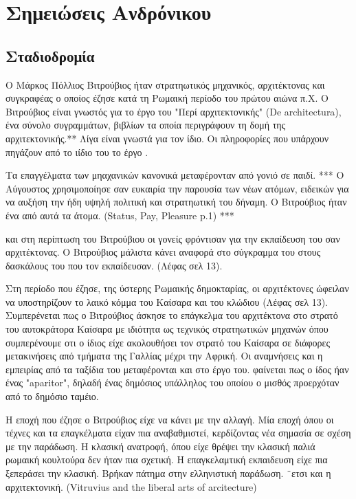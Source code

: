 
\section{Σημειώσεις Ανδρόνικου}

\subsection{Σταδιοδρομία}

Ο Μάρκος Πόλλιος Βιτρούβιος ήταν στρατηωτικός μηχανικός, αρχιτέκτονας και συγκραφέας ο οποίος έζησε κατά τη Ρωμαική περίοδο του πρώτου αιώνα π.Χ. Ο Βιτρούβιος είναι γνωστός για το έργο του "Περί αρχιτεκτονικής" (De architectura), ένα σύνολο συγραμμάτων, βιβλίων τα οποία περιγράφουν τη δομή της αρχιτεκτονικής.** Λίγα είναι γνωστά για τον ίδιο. Οι πληροφορίες που υπάρχουν πηγάζουν από το ιίδιο του το έργο \cite[σ.~390]{masterson_status_2004}.

Τα επαγγέλματα των μηαχανικών κανονικά μεταφέρονταν από γονιό σε παιδί.  *** 
Ο Αύγουστος χρησιμοποίησε σαν ευκαιρία την παρουσία των νέων ατόμων, ειδεικών για να αυξήση την ήδη υψηλή πολιτική και στρατηωτική του δήναμη. Ο Βιτρούβιος ήταν ένα από αυτά τα άτομα. (Status, Pay, Pleasure p.1) ***

και στη περίπτωση του Βιτρούβιου οι γονείς φρόντισαν για την εκπαίδευση του σαν αρχιτέκτονας. Ο Βιτρούβιος μάλιστα κάνει αναφορά στο σύγκραμμα του στους δασκάλους του που τον εκπαίδευσαν. (Λέφας σελ 13).

Στη περίοδο που έζησε, της ύστερης Ρωμαικής δημοκταρίας, οι αρχιτέκτονες ώφειλαν να υποστηρίζουν το λαικό κόμμα του Καίσαρα και του κλώδιου (Λέφας σελ 13). Συμπερένεται πως ο Βιτρούβιος άσκησε το επάγκελμα του αρχιτέκτονα στο στρατό του αυτοκράτορα Καίσαρα με ιδιότητα ως τεχνικός στρατηωτικών μηχανών όπου συμπερένουμε οτι ο ίδιος είχε ακολουθήσει τον στρατό του Καίσαρα σε διάφορες μετακινήσεις από τμήματα της Γαλλίας μέχρι την Αφρική. Οι αναμνήσεις και η εμπειρίας από τα ταξίδια του μεταφέρονται και στο έργο του. φαίνεται πως ο ίδος ήαν ένας "aparitor", δηλαδή ένας δημόσιος υπάλληλος του οποίου ο μισθός προερχόταν από το δημόσιο ταμέιο.

Η εποχή που έζησε ο Βιτρούβιος είχε να κάνει με την αλλαγή. Μία εποχή όπου οι τέχνες και τα επαγκέλματα είχαν πια αναβαθμιστεί, κερδίζοντας νέα σημασία σε σχέση με την παράδωση. Η κλασική ανατροφή, όπου είχε θρέψει την κλασική παλιά ρωμαική κουλτούρα δεν ήταν πια σχετική. Η επαγκελαμτική εκπαιδευση είχε πια ξεπεράσει την κλασική. Βρήκαν πάτημα στην ελληνιστική παράδωση. ¨ετσι και η αρχιτεκτονική. (Vitruvius and the liberal arts of arcitecture)

